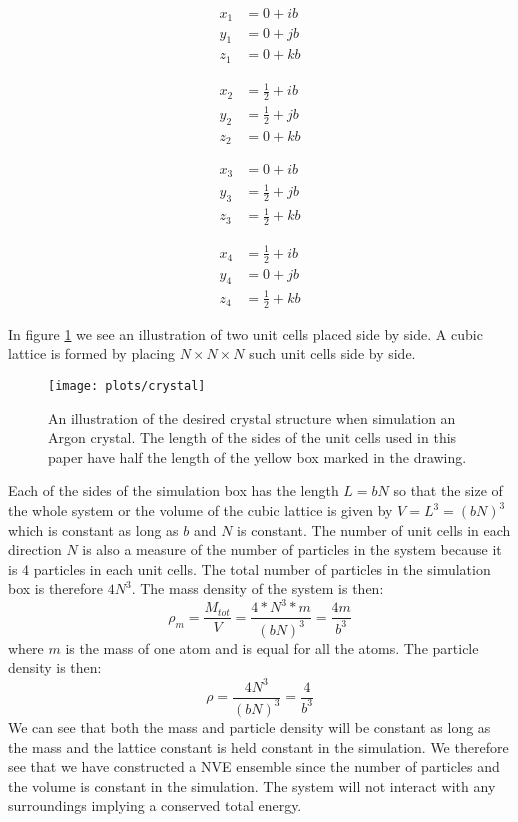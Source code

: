 \documentclass[11pt,a4wide]{article}
\begin{document}
\begin{minipage}{0.2\textwidth}
\begin{align*}
x_1 &= 0 + ib\\
y_1 &= 0 + jb \\
z_1 &= 0 + kb
\end{align*}
\smallskip
\end{minipage}
\begin{minipage}{0.25\textwidth}
\begin{align*}
x_2 &= \frac{1}{2} + ib\\
y_2 &= \frac{1}{2} + jb \\
z_2 &= 0 + kb
\end{align*}
\smallskip
\end{minipage}
\begin{minipage}{0.25\textwidth}
\begin{align*}
x_3 &= 0 + ib\\
y_3 &= \frac{1}{2} + jb \\
z_3 &= \frac{1}{2} + kb
\end{align*}
\smallskip
\end{minipage}
\begin{minipage}{0.25\textwidth}
\begin{align*}
x_4 &= \frac{1}{2} + ib\\
y_4 &= 0 + jb \\
z_4 &= \frac{1}{2} + kb
\end{align*}
\smallskip
\end{minipage}
In figure \ref{fig: ar_crystal} we see an illustration of two unit cells placed side by side. A cubic lattice is formed by placing $N\times N \times N$ such unit cells side by side. 

\begin{figure}
\centering
\texttt{[image: plots/crystal]}
\caption{An illustration of the desired crystal structure when simulation an Argon crystal. The length of the sides of the unit cells used in this paper have half the length of the yellow box marked in the drawing.}
\label{fig: ar_crystal}
\end{figure}


Each of the sides of the simulation box has the length $L = bN$ so that the size of the whole system or the volume of the cubic lattice is given by $V = L^3 = (bN)^3$ which is constant as long as $b$ and $N$ is constant. The number of unit cells in each direction $N$ is also a measure of the number of particles in the system because it is 4 particles in each unit cells. The total number of particles in the simulation box is therefore $4N^3$. The mass density of the system is then:
\[
\rho_m = \frac{M_{tot}}{V} = \frac{4*N^3*m}{(bN)^3} = \frac{4m}{b^3}
\]
where $m$ is the mass of one atom and is equal for all the atoms. The particle density is then:
\[
\rho = \frac{4N^3}{(bN)^3} = \frac{4}{b^3}
\]
We can see that both the mass and particle density will be constant as long as the mass and the lattice constant is held constant in the simulation. We therefore see that we have constructed a NVE ensemble since the number of particles and the volume is constant in the simulation. The system will not interact with any surroundings implying a conserved total energy. 
\end{document}
